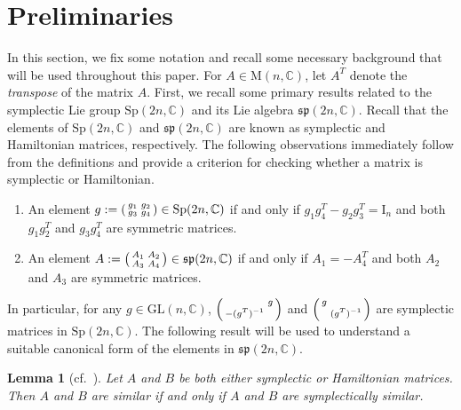 \documentclass[11pt,reqno]{amsart}
\numberwithin{equation}{section}
\newtheorem{lemma}[theorem]{Lemma}
\theoremstyle{definition}
\def\s{\mathbb S}
\def\C{\mathbb C}
\def\p{\mathcal P}
\def\M{{\mathrm M}}
\def\C{\mathbb {C}}
\def\p{\mathfrak {p}}
\def\s{\mathfrak {s}}
\begin{document}
\section{Preliminaries} \label{sec-prelim}
In this section, we fix some notation and recall some necessary background that will be used throughout this paper. 
For $ A\in {\M}(n, \C) $, let $A^T$ denote the {\it transpose} of the matrix $ A $.
First, we recall some primary results related to the symplectic Lie group $\mathrm{Sp}(2n,\mathbb{C})$ and its Lie algebra $\mathfrak{sp}(2n,\mathbb{C})$. 
Recall that the elements of $ \mathrm{Sp}(2n,\C) $ and $\mathfrak{sp}(2n,\C)$ are  known  as {symplectic} and Hamiltonian  matrices, respectively.   
The following observations immediately follow from the definitions and provide a criterion for checking whether a matrix is symplectic or Hamiltonian.
\begin{enumerate}[label = {({\bf  Ob.\arabic*})}]
	\item An element $g:=\begin{psmallmatrix}
		g_{1}	& g_{2}\\
		g_{3} & g_{4} 
	\end{psmallmatrix}\in \mathrm{Sp}(2n,\mathbb{C})$  if and only if  $g_{1}g_{4}^{T} -g_{2}g_{3} ^{T}= \mathrm{I}_{n}$ and both $g_{1}g_{2}^{T}$ and $g_{3}g_{4}^{T}$ are symmetric matrices.
	
	\item  An element 
	$A:=\begin{psmallmatrix}
		A_{1}	& A_{2}\\
		A_{3} & A_{4} 
	\end{psmallmatrix}\in \s\p(2n, \C)$  if and only if $A_{1} = -A_{4}^{T}$ and both $A_2$ and $A_3$ are symmetric matrices.
\end{enumerate} 

In particular,  for any  $g \in \mathrm{GL}(n,\mathbb{C})$,
$\begin{psmallmatrix}
	& g\\
	-({g}^{T})^{-1} & 
\end{psmallmatrix}$ and $\begin{psmallmatrix}
	g & \\
	& ({g}^{T})^{-1}
\end{psmallmatrix}$ are symplectic matrices in $\mathrm{Sp}(2n,\mathbb{C})$. 
The following result will be used to understand a suitable canonical form of the elements in $ \mathfrak{sp}(2n,\mathbb{C})$.
\begin{lemma}[cf.~{\cite[Corollary 22]{HM}}] 
	\label{lem-equi-symp-sim}
	Let $A$ and $B$ be both either symplectic or Hamiltonian matrices. Then $A$ and $B$ are similar if and only if $A$ and $B$ are symplectically similar.
\end{lemma}
\end{document}

